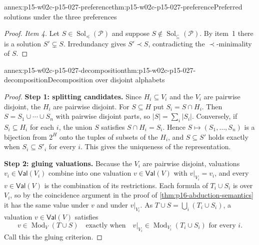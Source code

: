 \begin{annexitem}{annex:p15-w02c-p15-027-preference}{thm:p15-w02c-p15-027-preference}{Preferred solutions under the three preferences}
\begin{proof}
\emph{Item 4.} Let \(S\in\operatorname{Sol}_{\preceq}(\mathcal P)\) and
suppose \(S\notin\operatorname{Sol}_{\subseteq}(\mathcal P)\). By item~1
there is a solution \(S'\subsetneq S\). Irredundancy gives \(S'\prec S\),
contradicting the \(\prec\)-minimality of \(S\).
\end{proof}
\end{annexitem}

\begin{annexitem}{annex:p15-w02c-p15-027-decomposition}{thm:p15-w02c-p15-027-decomposition}{Decomposition over disjoint alphabets}
\begin{proof}
\textbf{Step 1: splitting candidates.}\enspace
Since \(H_i\subseteq V_i\) and the \(V_i\) are pairwise disjoint, the
\(H_i\) are pairwise disjoint. For \(S\subseteq H\) put \(S_i=S\cap H_i\).
Then \(S=S_1\cup\cdots\cup S_n\) with pairwise disjoint parts, so
\(|S|=\sum_i|S_i|\). Conversely, if \(S_i\subseteq H_i\) for each \(i\),
the union \(S\) satisfies \(S\cap H_i=S_i\). Hence
\(S\mapsto(S_1,\ldots,S_n)\) is a bijection from \(2^H\) onto the tuples of
subsets of the \(H_i\), and \(S\subseteq S'\) holds exactly when
\(S_i\subseteq S'_i\) for every \(i\). This gives the uniqueness of the
representation.

\textbf{Step 2: gluing valuations.}\enspace
Because the \(V_i\) are pairwise disjoint, valuations
\(v_i\in\mathsf{Val}(V_i)\) combine into one valuation
\(v\in\mathsf{Val}(V)\) with \(v|_{V_i}=v_i\), and every
\(v\in\mathsf{Val}(V)\) is the combination of its restrictions. Each
formula of \(T_i\cup S_i\) is over \(V_i\), so by the coincidence argument
in the proof of \cref{thm:p16-abduction-semantics} it has the same value
under \(v\) and under \(v|_{V_i}\). As
\(T\cup S=\bigcup_i(T_i\cup S_i)\), a valuation \(v\in\mathsf{Val}(V)\)
satisfies
\[
 v\in\operatorname{Mod}_V(T\cup S)
  \quad\text{exactly when}\quad
  v|_{V_i}\in\operatorname{Mod}_{V_i}(T_i\cup S_i)
      \text{ for every }i.
\]
Call this the gluing criterion.


\end{proof}
\end{annexitem}
